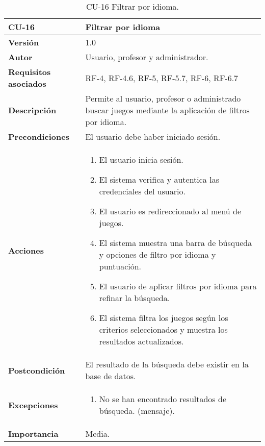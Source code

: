 \begin{table}[h!]
	\centering
	\begin{tabularx}{\linewidth}{ p{} p{} }
		\toprule
		\textbf{CU-16}    & \textbf{Filtrar por idioma}\\
		\toprule
		\textbf{Versión}              & 1.0    \\
		\textbf{Autor}                & Usuario, profesor y administrador. \\
		\textbf{Requisitos asociados} & RF-4, RF-4.6, RF-5, RF-5.7, RF-6, RF-6.7 \\
		\textbf{Descripción}          & Permite al usuario, profesor o administrado buscar juegos mediante la aplicación de filtros por idioma.\\
		\textbf{Precondiciones}         & El usuario debe haber iniciado sesión. \\
		\textbf{Acciones}             &
		\begin{enumerate}
			\def\labelenumi{\arabic{enumi}.}
			\tightlist
			\item El usuario inicia sesión.
            \item El sistema verifica y autentica las credenciales del usuario.
            \item El usuario es redireccionado al menú de juegos.
            \item El sistema muestra una barra de búsqueda y opciones de filtro por idioma y puntuación.
            \item El usuario de aplicar filtros por idioma para refinar la búsqueda.
            \item El sistema filtra los juegos según los criterios seleccionados y muestra los resultados actualizados.
		\end{enumerate}\\
         \textbf{Postcondición}             & El resultado de la búsqueda debe existir en la base de datos. \\
		\textbf{Excepciones}             &
		\begin{enumerate}
			\def\labelenumi{\arabic{enumi}.}
			\tightlist
			\item No se han encontrado resultados de búsqueda. (mensaje).
		\end{enumerate}\\
		\textbf{Importancia}          & Media. \\
		\bottomrule
	\end{tabularx}
	\caption{CU-16 Filtrar por idioma.}
\end{table}

